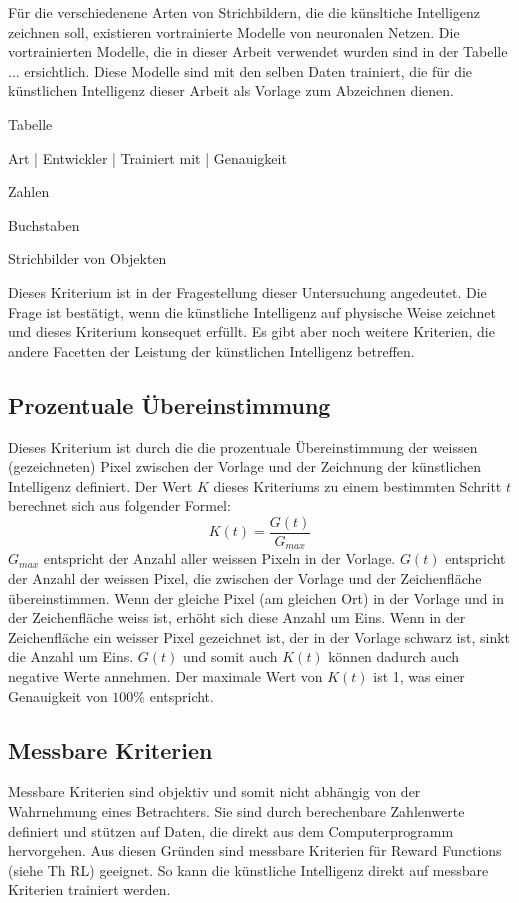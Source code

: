 Für die verschiedenene Arten von Strichbildern, die die künsltiche Intelligenz
zeichnen soll, existieren vortrainierte Modelle von neuronalen Netzen. Die
vortrainierten Modelle, die in dieser Arbeit verwendet wurden sind in der
Tabelle ... ersichtlich. Diese Modelle sind mit den selben Daten trainiert, die für
die künstlichen Intelligenz dieser Arbeit als Vorlage zum Abzeichnen dienen.


Tabelle

Art       |       Entwickler      |     Trainiert mit     |      Genauigkeit 

Zahlen  

Buchstaben

Strichbilder von Objekten


Dieses Kriterium ist in der Fragestellung dieser Untersuchung angedeutet. Die
Frage ist bestätigt, wenn die künstliche Intelligenz auf physische Weise
zeichnet und dieses Kriterium konsequet erfüllt. Es gibt aber noch weitere
Kriterien, die andere Facetten der Leistung der künstlichen Intelligenz
betreffen.


\subsection{Prozentuale Übereinstimmung}
Dieses Kriterium ist durch die die prozentuale Übereinstimmung der weissen
(gezeichneten) Pixel zwischen der Vorlage und der Zeichnung der künstlichen
Intelligenz definiert. Der Wert $K$ dieses Kriteriums zu einem bestimmten
Schritt $t$ berechnet sich aus folgender Formel:
\begin{equation}
  \label{eq:m_reward}
  K(t) = \frac{G(t)}{G_{max}}
\end{equation}
$G_{max}$ entspricht der Anzahl aller weissen Pixeln in der Vorlage. $G(t)$
entspricht der Anzahl der weissen Pixel, die zwischen der Vorlage und der
Zeichenfläche übereinstimmen. Wenn der gleiche Pixel (am gleichen Ort) in der
Vorlage und in der Zeichenfläche weiss ist, erhöht sich diese Anzahl um Eins.
Wenn in der Zeichenfläche ein weisser Pixel gezeichnet ist, der in der Vorlage
schwarz ist, sinkt die Anzahl um Eins. $G(t)$ und somit auch $K(t)$ können
dadurch auch negative Werte annehmen. Der maximale Wert von $K(t)$ ist 1, was
einer Genauigkeit von $100\%$ entspricht.





 


\subsection*{Messbare Kriterien}
\label{chap:m_messbare}
Messbare Kriterien sind objektiv und somit nicht abhängig von der Wahrnehmung
eines Betrachters. Sie sind durch berechenbare Zahlenwerte definiert und stützen
auf Daten, die direkt aus dem Computerprogramm hervorgehen. Aus diesen Gründen
sind messbare Kriterien für Reward Functions (siehe Th RL) geeignet. So kann die %
künstliche Intelligenz direkt auf messbare Kriterien trainiert werden.

